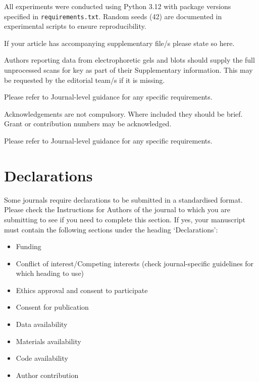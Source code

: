 \documentclass[pdflatex,sn-basic]{sn-jnl}           %
\theoremstyle{thmstyleone}%
\theoremstyle{thmstyletwo}%
\theoremstyle{thmstylethree}%
\begin{document}
\begin{appendices}
All experiments were conducted using Python 3.12 with package versions specified in \texttt{requirements.txt}. Random seeds (42) are documented in experimental scripts to ensure reproducibility.

\end{appendices}

\clearpage


If your article has accompanying supplementary file/s please state so here. 

Authors reporting data from electrophoretic gels and blots should supply the full unprocessed scans for key as part of their Supplementary information. This may be requested by the editorial team/s if it is missing.

Please refer to Journal-level guidance for any specific requirements.


Acknowledgements are not compulsory. Where included they should be brief. Grant or contribution numbers may be acknowledged.

Please refer to Journal-level guidance for any specific requirements.

\section*{Declarations}

Some journals require declarations to be submitted in a standardised format. Please check the Instructions for Authors of the journal to which you are submitting to see if you need to complete this section. If yes, your manuscript must contain the following sections under the heading `Declarations':

\begin{itemize}
\item Funding
\item Conflict of interest/Competing interests (check journal-specific guidelines for which heading to use)
\item Ethics approval and consent to participate
\item Consent for publication
\item Data availability 
\item Materials availability
\item Code availability 
\item Author contribution
\end{itemize}
\end{document}
